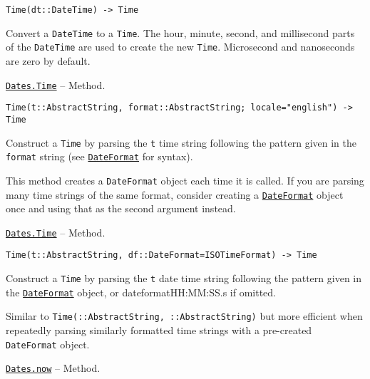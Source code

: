 \begin{adjustwidth}{2em}{0pt}


\begin{verbatim}
Time(dt::DateTime) -> Time
\end{verbatim}

Convert a \texttt{DateTime} to a \texttt{Time}. The hour, minute, second, and millisecond parts of the \texttt{DateTime} are used to create the new \texttt{Time}. Microsecond and nanoseconds are zero by default.



\end{adjustwidth}
\hypertarget{13054564027670337740}{}
\hyperlink{13054564027670337740}{\texttt{Dates.Time}}  -- {Method.}

\begin{adjustwidth}{2em}{0pt}


\begin{verbatim}
Time(t::AbstractString, format::AbstractString; locale="english") -> Time
\end{verbatim}

Construct a \texttt{Time} by parsing the \texttt{t} time string following the pattern given in the \texttt{format} string (see \hyperlink{18093459443158853001}{\texttt{DateFormat}} for syntax).

This method creates a \texttt{DateFormat} object each time it is called. If you are parsing many time strings of the same format, consider creating a \hyperlink{18093459443158853001}{\texttt{DateFormat}} object once and using that as the second argument instead.



\end{adjustwidth}
\hypertarget{1809800741729780028}{}
\hyperlink{1809800741729780028}{\texttt{Dates.Time}}  -- {Method.}

\begin{adjustwidth}{2em}{0pt}


\begin{verbatim}
Time(t::AbstractString, df::DateFormat=ISOTimeFormat) -> Time
\end{verbatim}

Construct a \texttt{Time} by parsing the \texttt{t} date time string following the pattern given in the \hyperlink{18093459443158853001}{\texttt{DateFormat}} object, or dateformat{\textquotedbl}HH:MM:SS.s{\textquotedbl} if omitted.

Similar to \texttt{Time(::AbstractString, ::AbstractString)} but more efficient when repeatedly parsing similarly formatted time strings with a pre-created \texttt{DateFormat} object.



\end{adjustwidth}
\hypertarget{18169882256128304087}{}
\hyperlink{18169882256128304087}{\texttt{Dates.now}}  -- {Method.}

